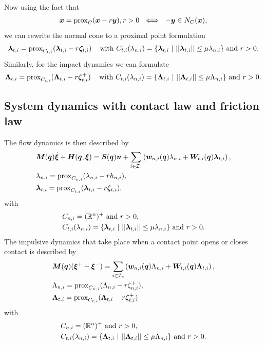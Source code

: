 \documentclass[../DC2017114Bouma.tex]{subfiles}
\begin{document}
Now using the fact that
\begin{align}
{\boldsymbol{x}} = \operatorname{\text{prox}}_C({\boldsymbol{x}} -r{\boldsymbol{y}}), r > 0\ \iff\ -{\boldsymbol{y}}\in N_C({\boldsymbol{x}}),
\end{align}
we can rewrite the normal cone to a proximal point formulation
\begin{align}
\boldsymbol{\lambda}_{t,i} = \operatorname{\text{prox}}_{C_{t,i}}(\boldsymbol{\lambda}_{t,i} - r\boldsymbol{\zeta}_{t,i})\,\quad\text{with }C_{t,i}(\lambda_{n,i}) = \{\boldsymbol{\lambda}_{t,i}\ |\ ||\boldsymbol{\lambda}_{t,i}|| \leq \mu\lambda_{n,i}\}\text{ and }r>0.
\end{align}
Similarly, for the impact dynamics we can formulate
\begin{align}
\boldsymbol{\Lambda}_{t,i} = \operatorname{\text{prox}}_{C_{t,i}}(\boldsymbol{\Lambda}_{t,i} - r\boldsymbol{\zeta}^+_{t,i})\,\quad \text{with }C_{t,i}(\lambda_{n,i}) = \{\boldsymbol{\Lambda}_{t,i}\ |\ ||\boldsymbol{\Lambda}_{t,i}|| \leq \mu\Lambda_{n,i}\}\text{ and }r>0.
\end{align}

\subsection{System dynamics with contact law and friction law}
The flow dynamics is then described by
\begin{align}
&{\boldsymbol{M}}({\boldsymbol{q}})\dot{\boldsymbol{\xi}} + {\boldsymbol{H}}({\boldsymbol{q}},\boldsymbol{\xi}) = {\boldsymbol{S}}({\boldsymbol{q}}){\boldsymbol{u}} + \sum_{i\in\mathcal{I}_c}\left({\boldsymbol{w}}_{n,i}({\boldsymbol{q}})\lambda_{n,i} + {\boldsymbol{W}}_{t,i}({\boldsymbol{q}})\boldsymbol{\lambda}_{t,i} \right), \label{eq:proxcontact1}\\
&\lambda_{n,i} = \operatorname{\text{prox}}_{C_{n,i}}(\lambda_{n,i} - rh_{n,i}),\label{eq:proxcontact2}\\
&\boldsymbol{\lambda}_{t,i} = \operatorname{\text{prox}}_{C_{t,i}}(\boldsymbol{\lambda}_{t,i} - r\boldsymbol{\zeta}_{t,i}),\label{eq:proxcontact3}
\end{align}
with
\begin{align}
&C_{n,i} = (\mathbb{R}^n)^+\text{ and } r>0,\\
&C_{t,i}(\lambda_{n,i}) = \{\boldsymbol{\lambda}_{t,i}\ |\ ||\boldsymbol{\lambda}_{t,i}|| \leq \mu\lambda_{n,i}\}\text{ and }r>0.
\end{align}
The impulsive dynamics that take place when a contact point opens or closes contact is described by
\begin{align}
&{\boldsymbol{M}}({\boldsymbol{q}})(\boldsymbol{\xi}^+ - \boldsymbol{\xi}^-) = \sum_{i\in\mathcal{I}_c}\left( {\boldsymbol{w}}_{n,i}({\boldsymbol{q}})\Lambda_{n,i} + {\boldsymbol{W}}_{t,i}({\boldsymbol{q}})\boldsymbol{\Lambda}_{t,i}\right), \label{eq:proximpact1}\\
&\Lambda_{n,i} = \operatorname{\text{prox}}_{C_{n,i}}(\Lambda_{n,i} - r\zeta^+_{n,i}),\label{eq:proximpact2}\\
&\boldsymbol{\Lambda}_{t,i} = \operatorname{\text{prox}}_{C_{t,i}}(\boldsymbol{\Lambda}_{t,i} - r\boldsymbol{\zeta}^+_{t,i})\,\label{eq:proximpact3}
\end{align}
with
\begin{align}
&C_{n,i} = (\mathbb{R}^n)^+\text{ and } r>0,\\
&C_{t,i}(\lambda_{n,i}) = \{\boldsymbol{\Lambda}_{t,i}\ |\ ||\boldsymbol{\Lambda}_{t,i}|| \leq \mu\Lambda_{n,i}\}\text{ and }r>0.
\end{align}
\end{document}
